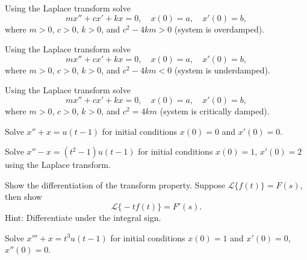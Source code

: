 \begin{exercise}
Using the Laplace transform solve
\begin{equation*}
m x'' + c x' + k x = 0 , \quad x(0) = a, \quad x'(0) = b ,
\end{equation*}
where $m > 0$, $c > 0$, $k > 0$, and
$c^2 - 4km > 0$ (system is overdamped).
\end{exercise}

\begin{exercise}
Using the Laplace transform solve
\begin{equation*}
m x'' + c x' + k x = 0 , \quad x(0) = a, \quad x'(0) = b ,
\end{equation*}
where $m > 0$, $c > 0$, $k > 0$, and
$c^2 - 4km < 0$ (system is underdamped).
\end{exercise}

\begin{exercise}
Using the Laplace transform solve
\begin{equation*}
m x'' + c x' + k x = 0 , \quad x(0) = a, \quad x'(0) = b ,
\end{equation*}
where $m > 0$, $c > 0$, $k > 0$, and
$c^2 = 4km$ (system is critically damped).
\end{exercise}

\begin{exercise}
Solve $x'' + x = u(t-1)$ for initial conditions $x(0) = 0$ and $x'(0) = 0$.
\end{exercise}

\begin{exercise}\ansMark%
Solve $x''-x = (t^2-1) u(t-1)$ for initial conditions $x(0)=1$, $x'(0) = 2$
using the Laplace transform.
\end{exercise}
 

\begin{exercise}
Show the differentiation of the transform property.  Suppose
$\mathcal{L} \bigl\{ f(t) \bigr\} = F(s)$, then show
\begin{equation*}
\mathcal{L} \bigl\{ -t f(t) \bigr\} = F'(s) .
\end{equation*}
Hint: Differentiate under the integral sign.
\end{exercise}

\begin{exercise}
Solve $x''' + x = t^3 u(t-1)$ for initial conditions $x(0) = 1$ and $x'(0) =
0$, $x''(0) = 0$.
\end{exercise}


